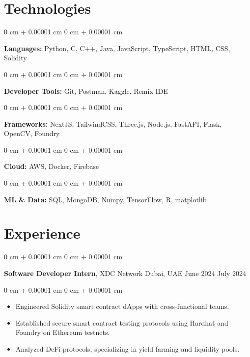 \documentclass[10pt, letterpaper]{article}
\newenvironment{highlights}{
    \begin{itemize}[
        topsep=0.10 cm,
        parsep=0.10 cm,
        partopsep=0pt,
        itemsep=0pt,
        leftmargin=0 cm + 10pt
    ]
}{
    \end{itemize}
}
\newenvironment{onecolentry}{
    \begin{adjustwidth}{
        0 cm + 0.00001 cm
    }{
        0 cm + 0.00001 cm
    }
}{
    \end{adjustwidth}
}
\newenvironment{twocolentry}[2][]{
    \onecolentry
    \def\secondColumn{#2}
    \setcolumnwidth{\fill, 4.5 cm}
    \begin{paracol}{2}
}{
    \switchcolumn \raggedleft \secondColumn
    \end{paracol}
    \endonecolentry
}
\begin{document}
    \section{Technologies}

        \begin{onecolentry}
            \textbf{Languages:} Python, C, C++, Java, JavaScript, TypeScript, HTML, CSS, Solidity \end{onecolentry}

        \begin{onecolentry}
            \textbf{Developer Tools:} Git, Postman, Kaggle, Remix IDE \end{onecolentry}
        
        \begin{onecolentry}
            \textbf{Frameworks:} NextJS, TailwindCSS, Three.js, Node.js, FastAPI, Flask, OpenCV, Foundry  
        \end{onecolentry}

        \begin{onecolentry}
            \textbf{Cloud:} AWS, Docker, Firebase \end{onecolentry}
        
        \begin{onecolentry}
            \textbf{ML \& Data:} SQL, MongoDB, Numpy, TensorFlow, R, matplotlib \end{onecolentry}

    \section{Experience}

        \begin{twocolentry}{
            June 2024 \textendash July 2024 
        }
            \textbf{Software Developer Intern}, XDC Network  \textendash  Dubai, UAE\end{twocolentry}

        \vspace{0.10 cm}
        \begin{onecolentry}
            \begin{highlights}
                \item Engineered Solidity smart contract dApps with cross-functional teams.
                \item Established secure smart contract testing protocols using Hardhat and Foundry on Ethereum testnets.
                \item Analyzed DeFi protocols, specializing in yield farming and liquidity pools.
            \end{highlights}
        \end{onecolentry}
\end{document}
